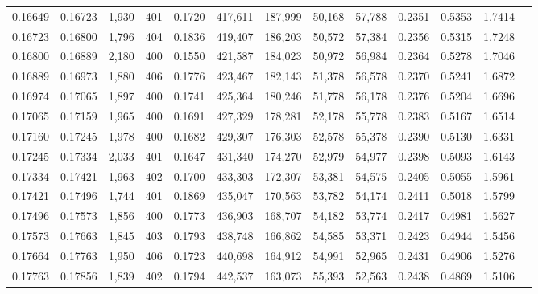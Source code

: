 \begin{tabular}{rrrrrrrrrrrrr}
0.16649 & 0.16723 &  1,930 & 401 &                                     0.1720 & 417,611 & 187,999 &  50,168 &  57,788 & 0.2351 & 0.5353 & 1.7414 \\
0.16723 & 0.16800 &  1,796 & 404 &                                     0.1836 & 419,407 & 186,203 &  50,572 &  57,384 & 0.2356 & 0.5315 & 1.7248 \\
0.16800 & 0.16889 &  2,180 & 400 &                                     0.1550 & 421,587 & 184,023 &  50,972 &  56,984 & 0.2364 & 0.5278 & 1.7046 \\
0.16889 & 0.16973 &  1,880 & 406 &                                     0.1776 & 423,467 & 182,143 &  51,378 &  56,578 & 0.2370 & 0.5241 & 1.6872 \\
0.16974 & 0.17065 &  1,897 & 400 &                                     0.1741 & 425,364 & 180,246 &  51,778 &  56,178 & 0.2376 & 0.5204 & 1.6696 \\
0.17065 & 0.17159 &  1,965 & 400 &                                     0.1691 & 427,329 & 178,281 &  52,178 &  55,778 & 0.2383 & 0.5167 & 1.6514 \\
0.17160 & 0.17245 &  1,978 & 400 &                                     0.1682 & 429,307 & 176,303 &  52,578 &  55,378 & 0.2390 & 0.5130 & 1.6331 \\
0.17245 & 0.17334 &  2,033 & 401 &                                     0.1647 & 431,340 & 174,270 &  52,979 &  54,977 & 0.2398 & 0.5093 & 1.6143 \\
0.17334 & 0.17421 &  1,963 & 402 &                                     0.1700 & 433,303 & 172,307 &  53,381 &  54,575 & 0.2405 & 0.5055 & 1.5961 \\
0.17421 & 0.17496 &  1,744 & 401 &                                     0.1869 & 435,047 & 170,563 &  53,782 &  54,174 & 0.2411 & 0.5018 & 1.5799 \\
0.17496 & 0.17573 &  1,856 & 400 &                                     0.1773 & 436,903 & 168,707 &  54,182 &  53,774 & 0.2417 & 0.4981 & 1.5627 \\
0.17573 & 0.17663 &  1,845 & 403 &                                     0.1793 & 438,748 & 166,862 &  54,585 &  53,371 & 0.2423 & 0.4944 & 1.5456 \\
0.17664 & 0.17763 &  1,950 & 406 &                                     0.1723 & 440,698 & 164,912 &  54,991 &  52,965 & 0.2431 & 0.4906 & 1.5276 \\
0.17763 & 0.17856 &  1,839 & 402 &                                     0.1794 & 442,537 & 163,073 &  55,393 &  52,563 & 0.2438 & 0.4869 & 1.5106 \\

\end{tabular}
